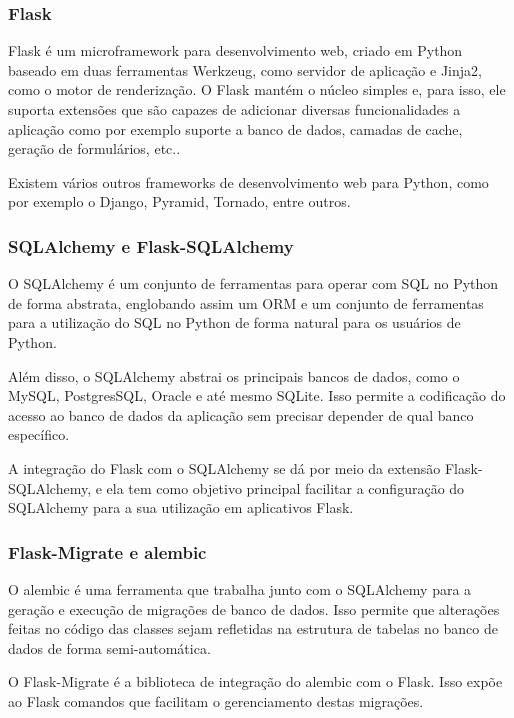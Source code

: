 \documentclass[
	article,			%
	11pt,				%
	oneside,			%
	a4paper,			%
	english,			%
	brazil,				%
	sumario=tradicional
	]{abntex2}
\begin{document}
\subsubsection{Flask}

Flask é um microframework para desenvolvimento web, criado em Python baseado em duas ferramentas Werkzeug, como servidor de aplicação e Jinja2, como o motor de renderização.
O Flask mantém o núcleo simples e, para isso, ele suporta extensões que são capazes de adicionar diversas funcionalidades a aplicação como por exemplo suporte a banco de dados, camadas de cache, geração de formulários, etc.. \cite{flask}

Existem vários outros frameworks de desenvolvimento web para Python, como por exemplo o Django, Pyramid, Tornado, entre outros.

\subsubsection{SQLAlchemy e Flask-SQLAlchemy}

O SQLAlchemy é um conjunto de ferramentas para operar com SQL no Python de forma abstrata, englobando assim um ORM e um conjunto de ferramentas para a utilização do SQL no Python de forma natural para os usuários de Python. \cite{sqlalchemy}

Além disso, o SQLAlchemy abstrai os principais bancos de dados, como o MySQL, PostgresSQL, Oracle e até mesmo SQLite.
Isso permite a codificação do acesso ao banco de dados da aplicação sem precisar depender de qual banco específico.

A integração do Flask com o SQLAlchemy se dá por meio da extensão Flask-SQLAlchemy, e ela tem como objetivo principal facilitar a configuração do SQLAlchemy para a sua utilização em aplicativos Flask. \cite{flasksqlalchemy}

\subsubsection{Flask-Migrate e alembic}

O alembic é uma ferramenta que trabalha junto com o SQLAlchemy para a geração e execução de migrações de banco de dados.
Isso permite que alterações feitas no código das classes sejam refletidas na estrutura de tabelas no banco de dados de forma semi-automática. \cite{alembic}

O Flask-Migrate é a biblioteca de integração do alembic com o Flask.
Isso expõe ao Flask comandos que facilitam o gerenciamento destas migrações. \cite{flaskmigrate}
\end{document}
